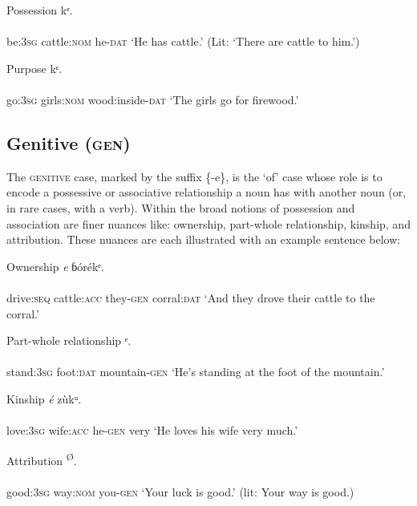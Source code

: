 Possession
\ea\label{ex:}
kᵉ. \\
    \\
be:\textsc{3sg}   cattle:\textsc{nom}    he-\textsc{dat}
\glt ‘He has cattle.’ (Lit: ‘There are cattle to him.’) 
\z




Purpose
\ea\label{ex:}
kᵋ. \\
    \\
go:\textsc{3sg}   girls:\textsc{nom}   wood:inside-\textsc{dat}
\glt ‘The girls go for firewood.’ 
\z






\subsection{Genitive (\textsc{gen})}


The \textsc{genitive} case, marked by the suffix \{-e\}, is the ‘of’ case whose role is to encode a possessive or associative relationship a noun has with another noun (or, in rare cases, with a verb). Within the broad notions of possession and association are finer nuances like: ownership, part-whole relationship, kinship, and attribution. These nuances are each illustrated with an example sentence below:




Ownership
\ea\label{ex:}
\textit{e}     ɓórékᵉ. \\
    \\
drive:\textsc{seq}   cattle:\textsc{acc}   they-\textsc{gen}   corral:\textsc{dat}
\glt ‘And they drove their cattle to the corral.’ 
\z




Part-whole relationship
\ea\label{ex:}
ᵉ. \\
    \\
stand:\textsc{3sg}   foot:\textsc{dat}   mountain-\textsc{gen}
\glt ‘He’s standing at the foot of the mountain.’ 
\z




Kinship
\ea\label{ex:}
\textit{é}     zùkᵘ. \\
    \\
love:\textsc{3sg}   wife:\textsc{acc}   he-\textsc{gen}   very
\glt ‘He loves his wife very much.’ 
\z




Attribution
\ea\label{ex:}
\textsuperscript{Ø}. \\
    \\
good:\textsc{3sg}   way:\textsc{nom}   you-\textsc{gen}
\glt ‘Your luck is good.’ (lit: Your way is good.) 
\z



